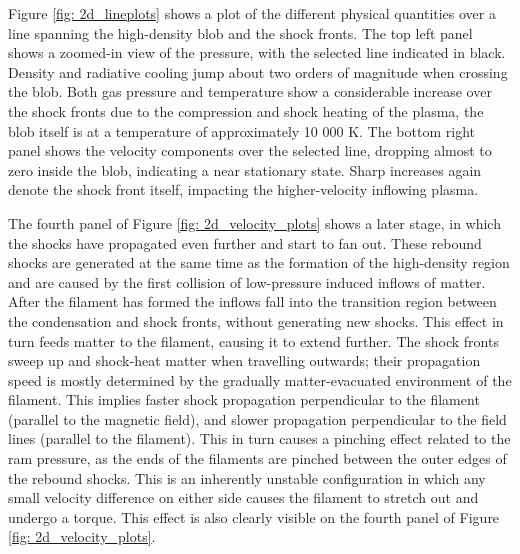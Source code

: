 Figure \ref{fig: 2d_lineplots} shows a plot of the different physical quantities over a line spanning the high-density blob and the shock fronts. The top left panel shows a zoomed-in view of the pressure, with the selected line indicated in black. Density and radiative cooling jump about two orders of magnitude when crossing the blob. Both gas pressure and temperature show a considerable increase over the shock fronts due to the compression and shock heating of the plasma, the blob itself is at a temperature of approximately 10 000 K. The bottom right panel shows the velocity components over the selected line, dropping almost to zero inside the blob, indicating a near stationary state. Sharp increases again denote the shock front itself, impacting the higher-velocity inflowing plasma.

The fourth panel of Figure \ref{fig: 2d_velocity_plots} shows a later stage, in which the shocks have propagated even further and start to fan out. These rebound shocks are generated at the same time as the formation of the high-density region and are caused by the first collision of low-pressure induced inflows of matter. After the filament has formed the inflows fall into the transition region between the condensation and shock fronts, without generating new shocks. This effect in turn feeds matter to the filament, causing it to extend further. The shock fronts sweep up and shock-heat matter when travelling outwards; their propagation speed is mostly determined by the gradually matter-evacuated environment of the filament. This implies faster shock propagation perpendicular to the filament (parallel to the magnetic field), and slower propagation perpendicular to the field lines (parallel to the filament). This in turn causes a pinching effect related to the ram pressure, as the ends of the filaments are pinched between the outer edges of the rebound shocks. This is an inherently unstable configuration in which any small velocity difference on either side causes the filament to stretch out and undergo a torque. This effect is also clearly visible on the fourth panel of Figure \ref{fig: 2d_velocity_plots}.


